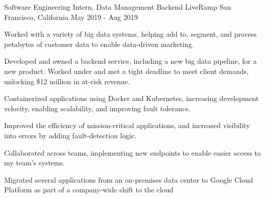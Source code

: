 

\begin{cventries}

    \cventry
      {Software Engineering Intern, Data Management Backend}
      {LiveRamp}
      {San Francisco, California}
      {May 2019 - Aug 2019}
      {
        \begin{cvitems}
          \item Worked with a variety of big data systems, helping add to, segment, and process petabytes of customer data to enable data-driven marketing.
          \item Developed and owned a backend service, including a new big data pipeline, for a new product. Worked under and met a tight deadline to meet client demands, unlocking \$12 million in at-risk revenue.
          \item Containerized applications using Docker and Kubernetes, increasing development velocity, enabling scalability, and improving fault tolerance.         
          \item Improved the efficiency of mission-critical applications, and increased visibility into errors by adding fault-detection logic.
          \item Collaborated across teams, implementing new endpoints to enable easier access to my team's systems.
          \item Migrated several applications from an on-premises data center to Google Cloud Platform as part of a company-wide shift to the cloud
        \end{cvitems}
      }


\end{cventries}
